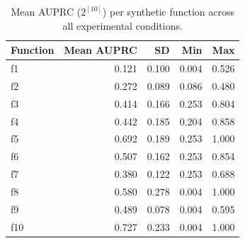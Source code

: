 \begin{table}[ht]
\centering
\caption{Mean AUPRC ($2^{[10]}$) per synthetic function across all experimental conditions.}
\label{tab:auprc_by_function}
\begin{tabular}{lrrrr}
\toprule
Function & Mean AUPRC & SD & Min & Max \\
\midrule
f1 & 0.121 & 0.100 & 0.004 & 0.526 \\
f2 & 0.272 & 0.089 & 0.086 & 0.480 \\
f3 & 0.414 & 0.166 & 0.253 & 0.804 \\
f4 & 0.442 & 0.185 & 0.204 & 0.858 \\
f5 & 0.692 & 0.189 & 0.253 & 1.000 \\
f6 & 0.507 & 0.162 & 0.253 & 0.854 \\
f7 & 0.380 & 0.122 & 0.253 & 0.688 \\
f8 & 0.580 & 0.278 & 0.004 & 1.000 \\
f9 & 0.489 & 0.078 & 0.004 & 0.595 \\
f10 & 0.727 & 0.233 & 0.004 & 1.000 \\
\bottomrule
\end{tabular}
\end{table}